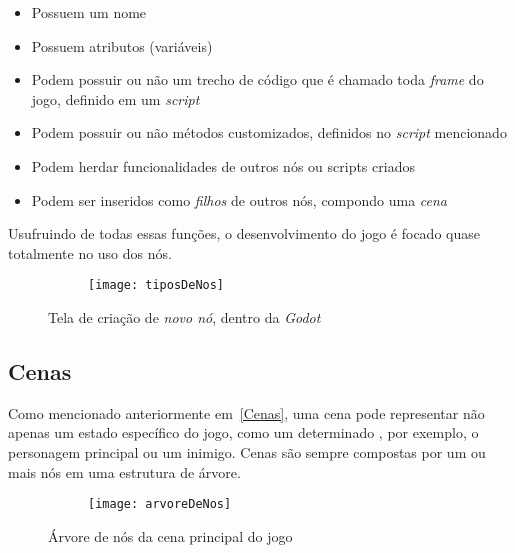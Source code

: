 \begin{itemize}
    \item Possuem um nome
    \item Possuem atributos (variáveis)
    \item Podem possuir ou não um trecho de código que é chamado toda \textit{frame} do jogo, definido em um \textit{script}
    \item Podem possuir ou não métodos customizados, definidos no \textit{script} mencionado
    \item Podem herdar funcionalidades de outros nós ou scripts criados
    \item Podem ser inseridos como \textit{filhos} de outros nós, compondo uma \textit{cena}
\end{itemize}

Usufruindo de todas essas funções, o desenvolvimento do jogo é focado quase totalmente no uso dos nós.

\begin{figure}
    \centering

    \begin{subfigure}{.9\textwidth}
        \centering
        \texttt{[image: tiposDeNos]}
    \end{subfigure}

    \caption{Tela de criação de \textit{novo nó}, dentro da \textit{Godot}}
\end{figure}

\subsection{Cenas}

Como mencionado anteriormente em~\ref{Cenas}, uma cena pode representar não apenas um estado específico do jogo, como um determinado \textquotedbl{}, por exemplo, o personagem principal ou um inimigo. Cenas são sempre compostas por um ou mais nós em uma estrutura de árvore.

\begin{figure}
    \centering

    \begin{subfigure}{.4\textwidth}
        \centering
        \texttt{[image: arvoreDeNos]}
    \end{subfigure}

    \caption{Árvore de nós da cena principal do jogo}
\end{figure}